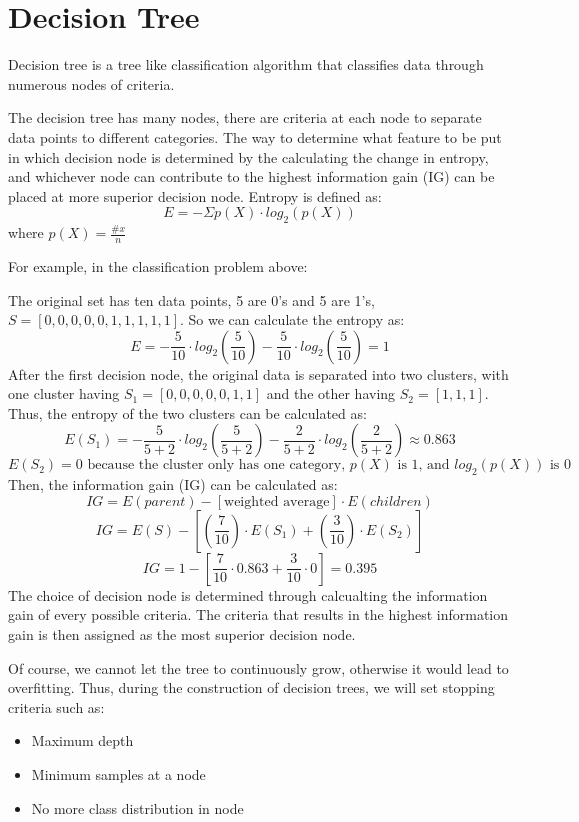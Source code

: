 \documentclass[12pt]{article}
\begin{document}
\section{Decision Tree}
Decision tree is a tree like classification algorithm that classifies data through numerous nodes of criteria.

The decision tree has many nodes, there are criteria at each node to separate data points to different categories. The way to determine what feature to be put in which decision node is determined by the calculating the change in entropy, and whichever node can contribute to the highest information gain (IG) can be placed at more superior decision node. Entropy is defined as:
$$E = -\Sigma p(X)\cdot log_2(p(X))$$
where $p(X) = \frac{\# x}{n}$

For example, in the classification problem above:

The original set has ten data points, 5 are 0's and 5 are 1's, $S = [0, 0, 0, 0, 0, 1, 1, 1, 1, 1]$. So we can calculate the entropy as:
$$E = -\frac{5}{10}\cdot log_2(\frac{5}{10}) - \frac{5}{10}\cdot log_2(\frac{5}{10}) = 1$$
After the first decision node, the original data is separated into two clusters, with one cluster having $S_1 = [0, 0, 0, 0, 0, 1, 1]$ and the other having $S_2 = [1, 1, 1]$. Thus, the entropy of the two clusters can be calculated as:
$$E(S_1) = -\frac{5}{5+2}\cdot log_2(\frac{5}{5+2}) - \frac{2}{5+2}\cdot log_2(\frac{2}{5+2}) \approx  0.863$$
$$E(S_2) = 0 \text{ because the cluster only has one category, }p(X)\text{ is 1, and }log_2(p(X))\text{ is 0}$$
Then, the information gain (IG) can be calculated as:
$$IG = E(parent) - [\text{weighted average}]\cdot E(children)$$
$$IG = E(S) - [(\frac{7}{10})\cdot E(S_1) + (\frac{3}{10})\cdot E(S_2)]$$
$$IG = 1 - [\frac{7}{10}\cdot 0.863 + \frac{3}{10}\cdot 0] = 0.395$$
The choice of decision node is determined through calcualting the information gain of every possible criteria. The criteria that results in the highest information gain is then assigned as the most superior decision node.

Of course, we cannot let the tree to continuously grow, otherwise it would lead to overfitting. Thus, during the construction of decision trees, we will set stopping criteria such as:
\begin{itemize}
	\item Maximum depth
	\item Minimum samples at a node
	\item No more class distribution in node
\end{itemize}
\newpage
\end{document}
